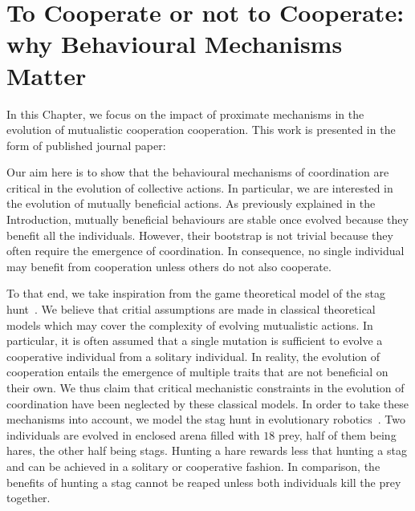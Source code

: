 \chapter{To Cooperate or not to Cooperate: why Behavioural Mechanisms Matter}
\label{chapter:C1_article1}

\setcounter{secnumdepth}{0}
\setcounter{minitocdepth}{1}
\minitoc[n] %

In this Chapter, we focus on the impact of proximate mechanisms in the evolution of mutualistic cooperation cooperation. This work is presented in the form of published journal paper:

\begin{quote}
\end{quote}

Our aim here is to show that the behavioural mechanisms of coordination are critical in the evolution of collective actions. In particular, we are interested in the evolution of mutually beneficial actions. As previously explained in the Introduction, mutually beneficial behaviours are stable once evolved because they benefit all the individuals. However, their bootstrap is not trivial because they often require the emergence of coordination. In consequence, no single individual may benefit from cooperation unless others do not also cooperate.

To that end, we take inspiration from the game theoretical model of the stag hunt~\parencite{Skyrms2004}. We believe that critial assumptions are made in classical theoretical models which may cover the complexity of evolving mutualistic actions. In particular, it is often assumed that a single mutation is sufficient to evolve a cooperative individual from a solitary individual. In reality, the evolution of cooperation entails the emergence of multiple traits that are not beneficial on their own. We thus claim that critical mechanistic constraints in the evolution of coordination have been neglected by these classical models. In order to take these mechanisms into account, we model the stag hunt in evolutionary robotics~\parencite{Nolfi2000, Doncieux2015}. Two individuals are evolved in enclosed arena filled with $18$ prey, half of them being hares, the other half being stags. Hunting a hare rewards less that hunting a stag and can be achieved in a solitary or cooperative fashion. In comparison, the benefits of hunting a stag cannot be reaped unless both individuals kill the prey together.

